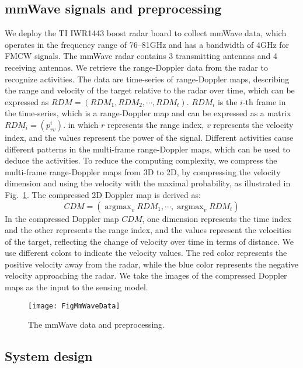\documentclass[journal]{IEEEtran}
\begin{document}
\subsection{mmWave signals and preprocessing}
We deploy the TI IWR1443 boost radar board to collect mmWave data, which operates in the frequency range of 76--81GHz and has a bandwidth of 4GHz for FMCW signals. The mmWave radar contains 3 transmitting antennas and 4 receiving antennas. We retrieve the range-Doppler data from the radar to recognize activities. The data are time-series of range-Doppler maps, describing the range and velocity of the target relative to the radar over time, which can be expressed as ${RDM} = ({RDM}_{1}, {RDM}_{2}, \cdots, {RDM}_{t})$. ${RDM}_{i}$ is the $i$-th frame in the time-series, which is a range-Doppler map and can be expressed as a matrix ${RDM}_{i}=(p^i_{rv})$.
in which $r$ represents the range index, $v$ represents the velocity index, and the values represent the power of the signal. Different activities cause different patterns in the multi-frame range-Doppler maps, which can be used to deduce the activities. To reduce the computing complexity, we compress the multi-frame range-Doppler maps from 3D to 2D, by compressing the velocity dimension and using the velocity with the maximal probability, as illustrated in Fig.~\ref{FigMmWaveData}. The compressed 2D Doppler map is derived as:
\begin{equation} 
{CDM} = (\mathop{\arg\max}_v{{RDM}_{1}},\cdots,\mathop{\arg\max}_v{{RDM}_{t}})
\end{equation}
In the compressed Doppler map ${CDM}$, one dimension represents the time index and the other represents the range index, and the values represent the velocities of the target, reflecting the change of velocity over time in terms of distance. We use different colors to indicate the velocity values. The red color represents the positive velocity away from the radar, while the blue color represents the negative velocity approaching the radar. We take the images of the compressed Doppler maps as the input to the sensing model. 

\begin{figure}
\centerline{\texttt{[image: FigMmWaveData]}}
\caption{The mmWave data and preprocessing.}
\label{FigMmWaveData}
\end{figure}

\subsection{System design}
\end{document}
